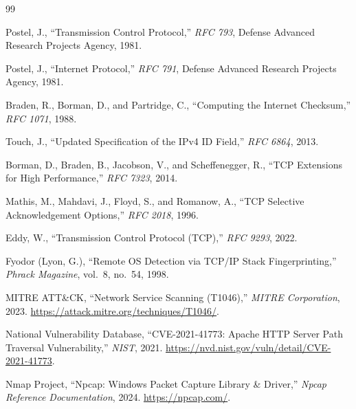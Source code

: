 \documentclass[11pt,a4paper]{article}
\begin{document}
\begin{thebibliography}{99}
\footnotesize
\setlength{\itemsep}{-2pt}
\setlength{\parskip}{0pt}

Postel, J., ``Transmission Control Protocol,'' \textit{RFC 793}, Defense Advanced Research Projects Agency, 1981.

Postel, J., ``Internet Protocol,'' \textit{RFC 791}, Defense Advanced Research Projects Agency, 1981.

Braden, R., Borman, D., and Partridge, C., ``Computing the Internet Checksum,'' \textit{RFC 1071}, 1988.

Touch, J., ``Updated Specification of the IPv4 ID Field,'' \textit{RFC 6864}, 2013.

Borman, D., Braden, B., Jacobson, V., and Scheffenegger, R., ``TCP Extensions for High Performance,'' \textit{RFC 7323}, 2014.

Mathis, M., Mahdavi, J., Floyd, S., and Romanow, A., ``TCP Selective Acknowledgement Options,'' \textit{RFC 2018}, 1996.

Eddy, W., ``Transmission Control Protocol (TCP),'' \textit{RFC 9293}, 2022.

Fyodor (Lyon, G.), ``Remote OS Detection via TCP/IP Stack Fingerprinting,'' \textit{Phrack Magazine}, vol.~8, no.~54, 1998.

MITRE ATT\&CK, ``Network Service Scanning (T1046),'' \textit{MITRE Corporation}, 2023. \url{https://attack.mitre.org/techniques/T1046/}.

National Vulnerability Database, ``CVE-2021-41773: Apache HTTP Server Path Traversal Vulnerability,'' \textit{NIST}, 2021. \url{https://nvd.nist.gov/vuln/detail/CVE-2021-41773}.

Nmap Project, ``Npcap: Windows Packet Capture Library \& Driver,'' \textit{Npcap Reference Documentation}, 2024. \url{https://npcap.com/}.

\end{thebibliography}
\end{document}
